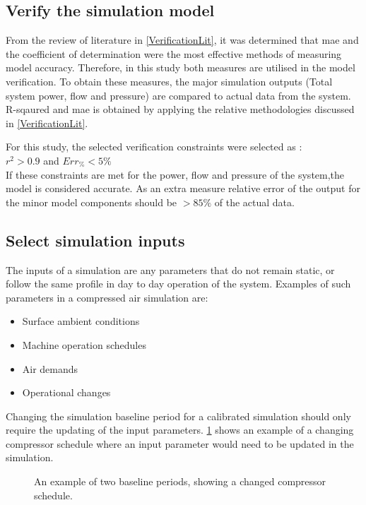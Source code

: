 	\subsection{Verify the simulation model}
	From the review of literature in \cref{VerificationLit}, it was determined that \gls{mae} and the coefficient of determination were the most effective methods of measuring model accuracy. Therefore, in this study both measures are utilised in the model verification. To obtain these measures, the major simulation outputs (Total system power, flow and pressure) are compared to actual data from the system. R-sqaured and \gls{mae} is obtained by applying the relative methodologies discussed in \cref{VerificationLit}.	
	\par 
	For this study, the selected verification constraints were selected as : \\ {$r^2 > 0.9 $ and $ Err_{\%} < 5\% $}\\ If these constraints are met for the power, flow and pressure of the system,the model is considered accurate. As an extra measure relative error of the output for the minor model components should be $ > 85\%$ of the actual data. 
		
	\subsection{Select simulation inputs}
		The inputs of a simulation are any parameters that do not remain static, or follow the same profile in day to day operation of the system. Examples of such parameters in a compressed air simulation are:
		\begin{itemize}
			\item Surface ambient conditions
			\item Machine operation schedules
			\item Air demands
			\item Operational changes
		\end{itemize} 
	Changing the simulation baseline period for a calibrated simulation should only require the updating of the input parameters. \cref{fig: Compressor schedule} shows an example of a changing compressor schedule where an input parameter would need to be updated in the simulation.	
			\clearpage
		\begin{figure}[h]
			\centering
			\fbox{}
			\caption{An example of two baseline periods, showing a changed compressor schedule.}
			\label{fig: Compressor schedule}
		\end{figure}
